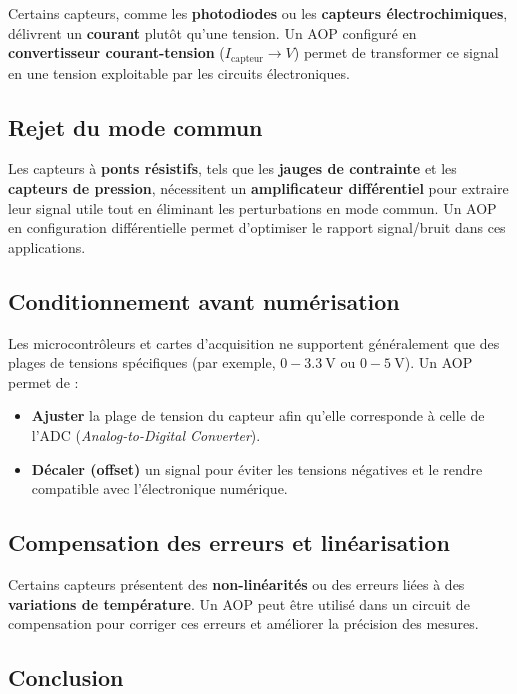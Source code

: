 Certains capteurs, comme les \textbf{photodiodes} ou les 
\textbf{capteurs électrochimiques}, délivrent un \textbf{courant} plutôt qu’une 
tension. Un AOP configuré en \textbf{convertisseur courant-tension} 
(\( I_{\text{capteur}} \rightarrow V \)) permet de transformer ce signal en une 
tension exploitable par les circuits électroniques.

\subsection{Rejet du mode commun}

Les capteurs à \textbf{ponts résistifs}, tels que les 
\textbf{jauges de contrainte} et les \textbf{capteurs de pression}, nécessitent 
un \textbf{amplificateur différentiel} pour extraire leur signal utile tout en 
éliminant les perturbations en mode commun. Un AOP en configuration 
différentielle permet d’optimiser le rapport signal/bruit dans ces applications.

\subsection{Conditionnement avant numérisation}

Les microcontrôleurs et cartes d’acquisition ne supportent généralement que des 
plages de tensions spécifiques (par exemple, \( 0 - \SI{3.3}{\volt} \) ou 
\( 0 - \SI{5}{\volt} \)). Un AOP permet de :
\begin{itemize}
    \item \textbf{Ajuster} la plage de tension du capteur afin qu’elle 
    corresponde à celle de l’ADC (\textit{Analog-to-Digital Converter}).
    \item \textbf{Décaler (offset)} un signal pour éviter les tensions négatives 
    et le rendre compatible avec l’électronique numérique.
\end{itemize}

\subsection{Compensation des erreurs et linéarisation}

Certains capteurs présentent des \textbf{non-linéarités} ou des erreurs liées à 
des \textbf{variations de température}. Un AOP peut être utilisé dans un circuit 
de compensation pour corriger ces erreurs et améliorer la précision des mesures.

\subsection{Conclusion}

